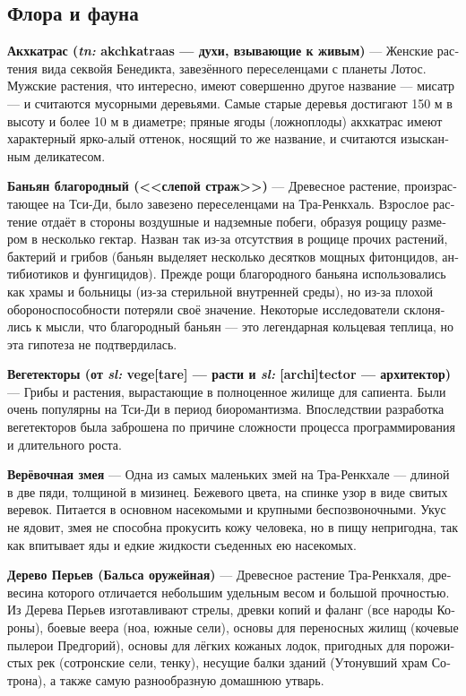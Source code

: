 \documentclass[a4paper,12pt,fleqn]{book}\usepackage{polyglossia}\setdefaultlanguage[babelshorthands=true]{russian}\setotherlanguage{english}\defaultfontfeatures{Ligatures=TeX,Mapping=tex-text}\usepackage{xcolor}\newcommand{\ml}[3]{#2}
\newcommand{\theterm}[3]{\textbf{\hypertarget{#1}{#2}} --- #3}
\newcommand{\theorigin}[3]{\textit{#1:} #2 --- #3}
\begin{document}
\subsection{Флора и фауна}

\theterm{akchkatraas}
{Акхкатрас (\theorigin{tn}{akchkatraas}{духи, взывающие к живым})}
{Женские растения вида секвойя Бенедикта, завезённого переселенцами с планеты Лотос.
Мужские растения, что интересно, имеют совершенно другое название --- мисатр --- и считаются мусорными деревьями.
Самые старые деревья достигают 150 м в высоту и более 10 м в диаметре;
пряные ягоды (ложноплоды) акхкатрас имеют характерный ярко-алый оттенок, носящий то же название, и считаются изысканным деликатесом.}

\theterm{noble-banyan} %
{Баньян благородный (<<слепой страж>>)}
{Древесное растение, произрастающее на Тси-Ди, было завезено переселенцами на Тра-Ренкхаль.
Взрослое растение отдаёт в стороны воздушные и надземные побеги, образуя рощицу размером в несколько гектар.
Назван так из-за отсутствия в рощице прочих растений, бактерий и грибов (баньян выделяет несколько десятков мощных фитонцидов, антибиотиков и фунгицидов).
Прежде рощи благородного баньяна использовались как храмы и больницы (из-за стерильной внутренней среды), но из-за плохой обороноспособности потеряли своё значение.
Некоторые исследователи склонялись к мысли, что благородный баньян --- это легендарная кольцевая теплица, но эта гипотеза не подтвердилась.}

\theterm{vegetectors}
{Вегетекторы (от \theorigin{sl}{vege[tare]}{расти} и \theorigin{sl}{[archi]tector}{архитектор})}
{Грибы и растения, вырастающие в полноценное жилище для сапиента.
Были очень популярны на Тси-Ди в период биоромантизма.
Впоследствии разработка вегетекторов была заброшена по причине сложности процесса программирования и длительного роста.}

\theterm{rope-snake} %
{Верёвочная змея}
{Одна из самых маленьких змей на Тра-Ренкхале --- длиной в две пяди, толщиной в мизинец.
Бежевого цвета, на спинке узор в виде свитых веревок.
Питается в основном насекомыми и крупными беспозвоночными.
Укус не ядовит, змея не способна прокусить кожу человека, но в пищу непригодна, так как впитывает яды и едкие жидкости съеденных ею насекомых.}

\theterm{featherwood}
{Дерево Перьев (Бальса оружейная)}
{Древесное растение Тра-Ренкхаля, древесина которого отличается небольшим удельным весом и большой прочностью.
Из Дерева Перьев изготавливают стрелы, древки копий и фаланг (все народы Короны), боевые веера (ноа, южные сели), основы для переносных жилищ (кочевые пылерои Предгорий), основы для лёгких кожаных лодок, пригодных для порожистых рек (сотронские сели, тенку), несущие балки зданий (Утонувший храм Сотрона), а также самую разнообразную домашнюю утварь.}
\end{document}
